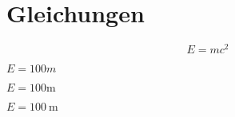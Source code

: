 \documentclass[12pt,ngerman]{scrartcl}
\begin{document}
\section*{Gleichungen}

\begin{equation}
E=mc^2
\end{equation}%

%

\(
E =  100m %
\)

\(
E =  100\si{\meter} %
\)


\(
E =  \SI{100}{\meter}  %
\)

\printnomenclature
\end{document}
